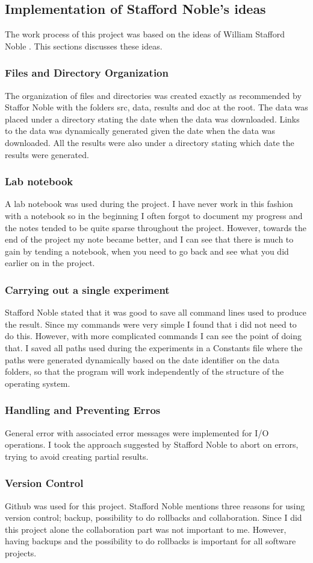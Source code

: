 \documentclass[10pt]{article}
\begin{document}
\subsection{Implementation of Stafford Noble's ideas}
The work process of this project was based on the ideas of William Stafford  Noble \cite{stafford}. This sections discusses these ideas.
\subsubsection{Files and Directory Organization}
The organization of files and directories was created exactly as recommended by
Staffor Noble with the folders src, data, results and doc at the root. The data was placed
under a directory stating the date when the data was downloaded. Links to the data
was dynamically generated given the date when the data was downloaded. All the results were also
under a directory stating which date the results were generated.
\subsubsection{Lab notebook}
A lab notebook was used during the project. I have never work in this fashion
with a notebook so in the beginning I often forgot to document my progress and the
notes tended to be quite sparse throughout the project. However, towards the end of
the project my note became better, and I can see that there is much to gain by tending
a notebook, when you need to go back and see what you did earlier on in the project.
\subsubsection{Carrying out a single experiment}
Stafford Noble stated that it was good to save all command lines used to produce
the result. Since my commands were very simple I found that i did not need to do this.
However, with more complicated commands I can see the point of doing that. I saved all
paths used during the experiments in a Constants file where the paths were generated dynamically
based on the date identifier on the data folders, so that the program
will work independently of the structure of the operating system.
\subsubsection{Handling and Preventing Erros}
General error with associated error messages were implemented for I/O operations.
I took the approach suggested by Stafford Noble to abort on errors, trying to avoid
creating partial results.
\subsubsection{Version Control}
Github was used for this project. Stafford Noble mentions three reasons for using
version control; backup, possibility to do rollbacks and collaboration. Since I did
this project alone the collaboration part was not important to me. However, having
backups and the possibility to do rollbacks is important for all software projects.

{}

\end{document}
